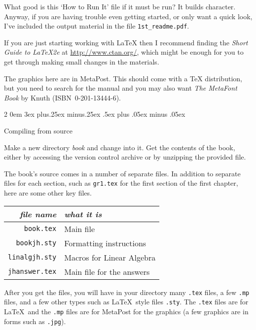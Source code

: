 \documentclass[titlepage]{article}
\makeatletter
\renewcommand{\subsection}{\@startsection{subsection}%
  {2}%
  {0em}%
  {3ex plus.25ex minus.25ex}%
  {.5ex plus .05ex minus .05ex}%
  {\bfseries\raggedright}}
\makeatother
\begin{document}
What good is this `How to Run It' file if it must be run?
It builds character.
Anyway, if you are having trouble even getting started, or only want a quick
look, I've included the output material in the file \texttt{1st\_readme.pdf}. 

If you are just starting working with \LaTeX{} then I recommend finding the 
\textit{Short Guide to \LaTeX2e} at
\url{http://www.ctan.org/}, which might be enough
for you to get through making small changes in the materials.

The graphics here are in MetaPost.
This should come with a \TeX{} distribution, but 
you need to search for the manual and you may also want 
\textit{The MetaFont Book} by Knuth
(ISBN~0-201-13444-6).





\subsection{Compiling from source}

Make a new directory \textit{book} and change into it.
Get the contents of the book, either by accessing the version control archive
or by unzipping the provided file.

The book's source comes in a number of separate files.
In addition to separate files for each section, such as 
\texttt{gr1.tex} for the first section of the first chapter,
here are some other key files.
\begin{center}
  \begin{tabular}{r|l}
    \textit{file name}  &\textit{what it is}  \\
    \hline
    \texttt{book.tex}     &Main file \\
    \texttt{bookjh.sty}   &Formatting instructions  \\
    \texttt{linalgjh.sty} &Macros for Linear Algebra \\
    \texttt{jhanswer.tex} &Main file for the answers \\
  \end{tabular}
\end{center}

After you get the files, you will have in your
directory many \texttt{.tex} files, a few \texttt{.mp} files, and 
a few other types such as \LaTeX\ style files \texttt{.sty}.
The \texttt{.tex} files are for \LaTeX\ and the \texttt{.mp} files
are for MetaPost for the graphics
(a few graphics are in forms such as \texttt{.jpg}).
\end{document}

